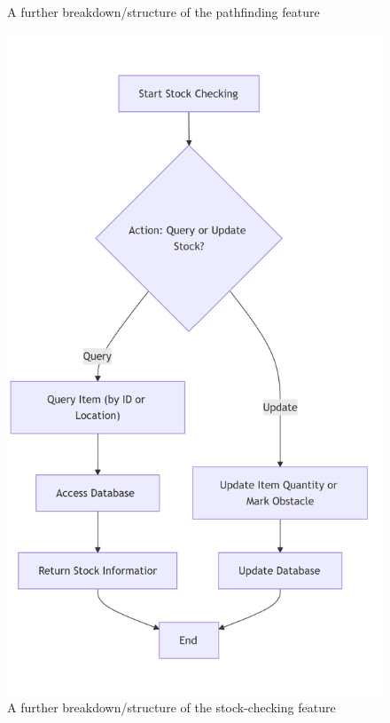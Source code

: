 \begin{figure}[!htbp]
\begin{minipage}{0.48\textwidth}
		\caption{A further breakdown/structure of the pathfinding feature}
		\label{fig:pfoutline} %
	\end{minipage}%
	\hfill %
	\begin{minipage}{0.48\textwidth} %
		\centering
		\includegraphics[width=0.9\linewidth]{Images/scoutline.png} %
		\caption{A further breakdown/structure of the stock-checking feature}
		\label{fig:scoutline} %
	\end{minipage}
	
	
\end{figure}

